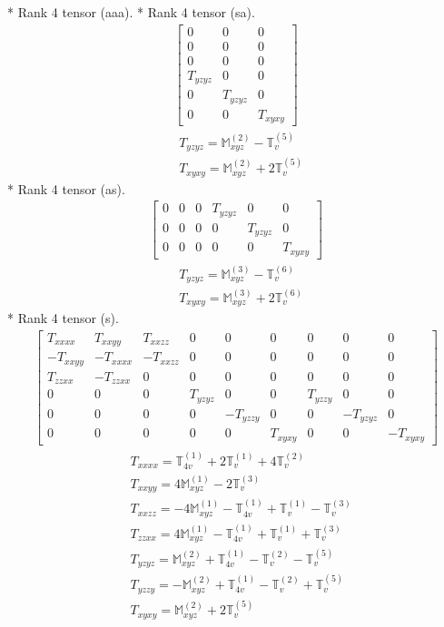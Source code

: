 \documentclass[fleqn,8pt,landscape]{jsarticle}
\begin{document}
* Rank 4 tensor (aaa).
* Rank 4 tensor (sa).
\begin{align*}
\begin{bmatrix} 0 & 0 & 0 \\ 0 & 0 & 0 \\ 0 & 0 & 0 \\ T_{yzyz} & 0 & 0 \\ 0 & T_{yzyz} & 0 \\ 0 & 0 & T_{xyxy} \end{bmatrix}
\end{align*}
\begin{align*}
& T_{yzyz} = \mathbb{M}_{xyz}^{(2)} - \mathbb{T}_{v}^{(5)} \\
& T_{xyxy} = \mathbb{M}_{xyz}^{(2)} + 2 \mathbb{T}_{v}^{(5)}
\end{align*}
* Rank 4 tensor (as).
\begin{align*}
\begin{bmatrix} 0 & 0 & 0 & T_{yzyz} & 0 & 0 \\ 0 & 0 & 0 & 0 & T_{yzyz} & 0 \\ 0 & 0 & 0 & 0 & 0 & T_{xyxy} \end{bmatrix}
\end{align*}
\begin{align*}
& T_{yzyz} = \mathbb{M}_{xyz}^{(3)} - \mathbb{T}_{v}^{(6)} \\
& T_{xyxy} = \mathbb{M}_{xyz}^{(3)} + 2 \mathbb{T}_{v}^{(6)}
\end{align*}
* Rank 4 tensor (s).
\begin{align*}
\begin{bmatrix} T_{xxxx} & T_{xxyy} & T_{xxzz} & 0 & 0 & 0 & 0 & 0 & 0 \\ - T_{xxyy} & - T_{xxxx} & - T_{xxzz} & 0 & 0 & 0 & 0 & 0 & 0 \\ T_{zzxx} & - T_{zzxx} & 0 & 0 & 0 & 0 & 0 & 0 & 0 \\ 0 & 0 & 0 & T_{yzyz} & 0 & 0 & T_{yzzy} & 0 & 0 \\ 0 & 0 & 0 & 0 & - T_{yzzy} & 0 & 0 & - T_{yzyz} & 0 \\ 0 & 0 & 0 & 0 & 0 & T_{xyxy} & 0 & 0 & - T_{xyxy} \end{bmatrix}
\end{align*}
\begin{align*}
& T_{xxxx} = \mathbb{T}_{4v}^{(1)} + 2 \mathbb{T}_{v}^{(1)} + 4 \mathbb{T}_{v}^{(2)} \\
& T_{xxyy} = 4 \mathbb{M}_{xyz}^{(1)} - 2 \mathbb{T}_{v}^{(3)} \\
& T_{xxzz} = - 4 \mathbb{M}_{xyz}^{(1)} - \mathbb{T}_{4v}^{(1)} + \mathbb{T}_{v}^{(1)} - \mathbb{T}_{v}^{(3)} \\
& T_{zzxx} = 4 \mathbb{M}_{xyz}^{(1)} - \mathbb{T}_{4v}^{(1)} + \mathbb{T}_{v}^{(1)} + \mathbb{T}_{v}^{(3)} \\
& T_{yzyz} = \mathbb{M}_{xyz}^{(2)} + \mathbb{T}_{4v}^{(1)} - \mathbb{T}_{v}^{(2)} - \mathbb{T}_{v}^{(5)} \\
& T_{yzzy} = - \mathbb{M}_{xyz}^{(2)} + \mathbb{T}_{4v}^{(1)} - \mathbb{T}_{v}^{(2)} + \mathbb{T}_{v}^{(5)} \\
& T_{xyxy} = \mathbb{M}_{xyz}^{(2)} + 2 \mathbb{T}_{v}^{(5)}
\end{align*}
\end{document}
